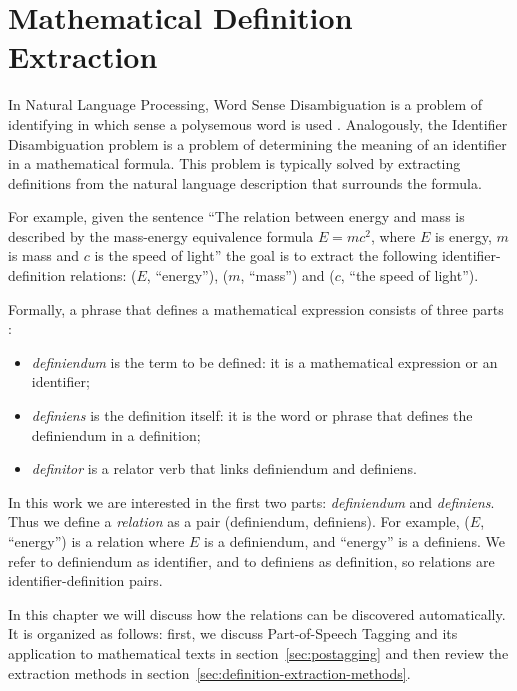 \section{Mathematical Definition Extraction} \label{sec:definitionextraction-top}

In Natural Language Processing, Word Sense Disambiguation is a problem of 
identifying in which sense a polysemous word is used \cite{jurafsky2000speech}.
Analogously, the Identifier Disambiguation problem is a problem of 
determining the meaning of an identifier in a mathematical formula. This 
problem is typically solved by extracting definitions from the natural 
language description that surrounds the formula. 

For example, given the sentence ``The relation between energy and mass is
described by  the mass-energy equivalence formula $E = mc^2$,
where $E$ is energy, $m$ is mass and $c$ is the speed of light''
the goal is to extract the following identifier-definition relations:
($E$, ``energy''), ($m$, ``mass'') and
($c$, ``the speed of light'').


Formally, a phrase that defines a mathematical expression consists of three parts \cite{kristianto2012extracting}:

\begin{itemize}
\itemsep1pt\parskip0pt
  \item \emph{definiendum} is the term to be defined: it is a mathematical expression
      or an identifier;
  \item \emph{definiens} is the definition itself: it is the word or phrase that defines the definiendum in a definition;
  \item \emph{definitor} is a relator verb that links definiendum and definiens.
\end{itemize}

In this work we are interested in the first two parts: \emph{definiendum} and
\emph{definiens}. Thus we define a \emph{relation} as a pair
(definiendum, definiens). For example, ($E$, ``energy'') is a relation where
$E$ is a definiendum, and ``energy'' is a definiens. We refer to definiendum as 
identifier, and to definiens as definition, so relations are identifier-definition
pairs. 

In this chapter we will discuss how the relations can be discovered automatically.
It is organized as follows: first, we discuss Part-of-Speech Tagging and its application
to mathematical texts in section~\ref{sec:postagging} and then 
review the extraction methods in section~\ref{sec:definition-extraction-methods}.


